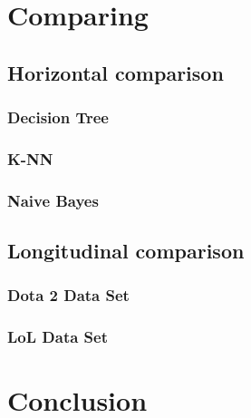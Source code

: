 \documentclass[sigconf]{acmart}
\begin{document}
\section{Comparing}

\subsection{Horizontal comparison}

\subsubsection{Decision Tree }

\subsubsection{K-NN}

\subsubsection{Naive Bayes}

\subsection{Longitudinal comparison}

\subsubsection{Dota 2 Data Set }

\subsubsection{LoL Data Set}

\section{Conclusion}

%



\begin{thebibliography}{9}


\end{thebibliography}
\end{document}
